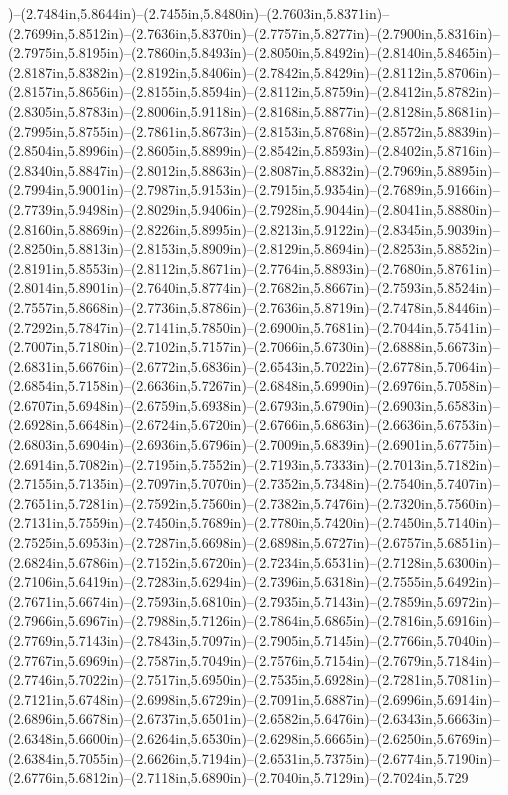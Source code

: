 )--(2.7484in,5.8644in)--(2.7455in,5.8480in)--(2.7603in,5.8371in)--(2.7699in,5.8512in)--(2.7636in,5.8370in)--(2.7757in,5.8277in)--(2.7900in,5.8316in)--(2.7975in,5.8195in)--(2.7860in,5.8493in)--(2.8050in,5.8492in)--(2.8140in,5.8465in)--(2.8187in,5.8382in)--(2.8192in,5.8406in)--(2.7842in,5.8429in)--(2.8112in,5.8706in)--(2.8157in,5.8656in)--(2.8155in,5.8594in)--(2.8112in,5.8759in)--(2.8412in,5.8782in)--(2.8305in,5.8783in)--(2.8006in,5.9118in)--(2.8168in,5.8877in)--(2.8128in,5.8681in)--(2.7995in,5.8755in)--(2.7861in,5.8673in)--(2.8153in,5.8768in)--(2.8572in,5.8839in)--(2.8504in,5.8996in)--(2.8605in,5.8899in)--(2.8542in,5.8593in)--(2.8402in,5.8716in)--(2.8340in,5.8847in)--(2.8012in,5.8863in)--(2.8087in,5.8832in)--(2.7969in,5.8895in)--(2.7994in,5.9001in)--(2.7987in,5.9153in)--(2.7915in,5.9354in)--(2.7689in,5.9166in)--(2.7739in,5.9498in)--(2.8029in,5.9406in)--(2.7928in,5.9044in)--(2.8041in,5.8880in)--(2.8160in,5.8869in)--(2.8226in,5.8995in)--(2.8213in,5.9122in)--(2.8345in,5.9039in)--(2.8250in,5.8813in)--(2.8153in,5.8909in)--(2.8129in,5.8694in)--(2.8253in,5.8852in)--(2.8191in,5.8553in)--(2.8112in,5.8671in)--(2.7764in,5.8893in)--(2.7680in,5.8761in)--(2.8014in,5.8901in)--(2.7640in,5.8774in)--(2.7682in,5.8667in)--(2.7593in,5.8524in)--(2.7557in,5.8668in)--(2.7736in,5.8786in)--(2.7636in,5.8719in)--(2.7478in,5.8446in)--(2.7292in,5.7847in)--(2.7141in,5.7850in)--(2.6900in,5.7681in)--(2.7044in,5.7541in)--(2.7007in,5.7180in)--(2.7102in,5.7157in)--(2.7066in,5.6730in)--(2.6888in,5.6673in)--(2.6831in,5.6676in)--(2.6772in,5.6836in)--(2.6543in,5.7022in)--(2.6778in,5.7064in)--(2.6854in,5.7158in)--(2.6636in,5.7267in)--(2.6848in,5.6990in)--(2.6976in,5.7058in)--(2.6707in,5.6948in)--(2.6759in,5.6938in)--(2.6793in,5.6790in)--(2.6903in,5.6583in)--(2.6928in,5.6648in)--(2.6724in,5.6720in)--(2.6766in,5.6863in)--(2.6636in,5.6753in)--(2.6803in,5.6904in)--(2.6936in,5.6796in)--(2.7009in,5.6839in)--(2.6901in,5.6775in)--(2.6914in,5.7082in)--(2.7195in,5.7552in)--(2.7193in,5.7333in)--(2.7013in,5.7182in)--(2.7155in,5.7135in)--(2.7097in,5.7070in)--(2.7352in,5.7348in)--(2.7540in,5.7407in)--(2.7651in,5.7281in)--(2.7592in,5.7560in)--(2.7382in,5.7476in)--(2.7320in,5.7560in)--(2.7131in,5.7559in)--(2.7450in,5.7689in)--(2.7780in,5.7420in)--(2.7450in,5.7140in)--(2.7525in,5.6953in)--(2.7287in,5.6698in)--(2.6898in,5.6727in)--(2.6757in,5.6851in)--(2.6824in,5.6786in)--(2.7152in,5.6720in)--(2.7234in,5.6531in)--(2.7128in,5.6300in)--(2.7106in,5.6419in)--(2.7283in,5.6294in)--(2.7396in,5.6318in)--(2.7555in,5.6492in)--(2.7671in,5.6674in)--(2.7593in,5.6810in)--(2.7935in,5.7143in)--(2.7859in,5.6972in)--(2.7966in,5.6967in)--(2.7988in,5.7126in)--(2.7864in,5.6865in)--(2.7816in,5.6916in)--(2.7769in,5.7143in)--(2.7843in,5.7097in)--(2.7905in,5.7145in)--(2.7766in,5.7040in)--(2.7767in,5.6969in)--(2.7587in,5.7049in)--(2.7576in,5.7154in)--(2.7679in,5.7184in)--(2.7746in,5.7022in)--(2.7517in,5.6950in)--(2.7535in,5.6928in)--(2.7281in,5.7081in)--(2.7121in,5.6748in)--(2.6998in,5.6729in)--(2.7091in,5.6887in)--(2.6996in,5.6914in)--(2.6896in,5.6678in)--(2.6737in,5.6501in)--(2.6582in,5.6476in)--(2.6343in,5.6663in)--(2.6348in,5.6600in)--(2.6264in,5.6530in)--(2.6298in,5.6665in)--(2.6250in,5.6769in)--(2.6384in,5.7055in)--(2.6626in,5.7194in)--(2.6531in,5.7375in)--(2.6774in,5.7190in)--(2.6776in,5.6812in)--(2.7118in,5.6890in)--(2.7040in,5.7129in)--(2.7024in,5.729
